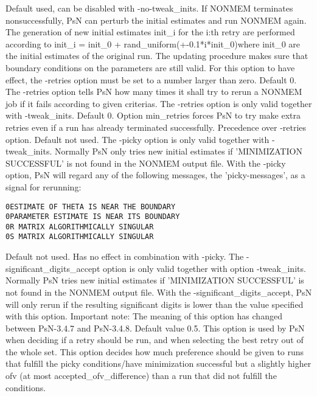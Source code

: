 \begin{optionlist}
Default used, can be disabled with -no-tweak\_inits. If NONMEM terminates nonsuccessfully, PsN can perturb the initial estimates and run NONMEM again. The generation of new initial estimates init\_i for the i:th retry are performed according to init\_i = init\_0 + rand\_uniform(+-0.1*i*init\_0)where init\_0 are the initial estimates of the original run. The updating procedure makes sure that boundary conditions on the parameters are still valid. For this option to have effect, the -retries option must be set to a number larger than zero. 
\nextopt
{}
Default 0. The -retries option tells PsN how many times it shall try to rerun a NONMEM job if it fails according to given criterias. The -retries option is only valid together with -tweak\_inits. 
\nextopt
{}
Default 0. Option min\_retries forces PsN to try make extra retries even if a run has already terminated successfully. Precedence over -retries option.  
\nextopt
{}
Default not used. The -picky option is only valid together with -tweak\_inits. Normally PsN only tries new initial estimates if 'MINIMIZATION SUCCESSFUL' is not found in the NONMEM output file. With the -picky option, PsN will regard any of the following messages, the 'picky-messages',  as a signal for rerunning:


\begin{verbatim}
0ESTIMATE OF THETA IS NEAR THE BOUNDARY
0PARAMETER ESTIMATE IS NEAR ITS BOUNDARY
0R MATRIX ALGORITHMICALLY SINGULAR
0S MATRIX ALGORITHMICALLY SINGULAR
\end{verbatim}
\nextopt
{}
Default not used. Has no effect in combination with -picky. The -significant\_digits\_accept option is only valid together with option -tweak\_inits. Normally PsN tries new initial estimates if 'MINIMIZATION SUCCESSFUL' is not found in the NONMEM output file. With the -significant\_digits\_accept, PsN will only rerun if the resulting significant digits is lower than the value specified with this option. 
\nextopt
{}
Important note: The meaning of this option has changed between PsN-3.4.7 and PsN-3.4.8. Default value 0.5. This option is used by PsN when deciding if a retry should be run, and when selecting the best retry out of the whole set. This option decides how much preference should be given to runs that fulfill the picky conditions/have minimization successful but a slightly higher ofv (at most accepted\_ofv\_difference) than a run that did not fulfill the conditions.  
\nextopt
\end{optionlist}

